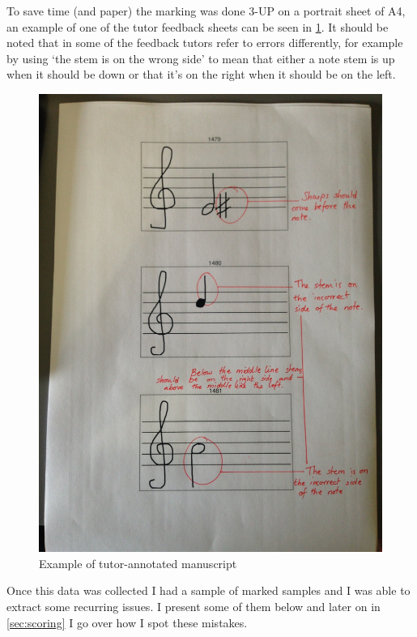 To save time (and paper) the marking was done 3-UP on a portrait sheet of A4, an example of one of the tutor feedback sheets can be seen in \cref{fig:teacher-sheet}. It should be noted that in some of the feedback tutors refer to errors differently, for example by using `the stem is on the wrong side' to mean that either a note stem is up when it should be down or that it's on the right when it should be on the left.

\begin{figure}[H]
  \centering
  \includegraphics[width=\linewidth]{gfx/photos/teacher-sheet-1.jpg}
  \caption{Example of tutor-annotated manuscript}
  \label{fig:teacher-sheet}
\end{figure}

Once this data was collected I had a sample of  marked samples  and I was able to extract some recurring issues. I present some of them below and later on in \cref{sec:scoring} I go over how I spot these mistakes.

